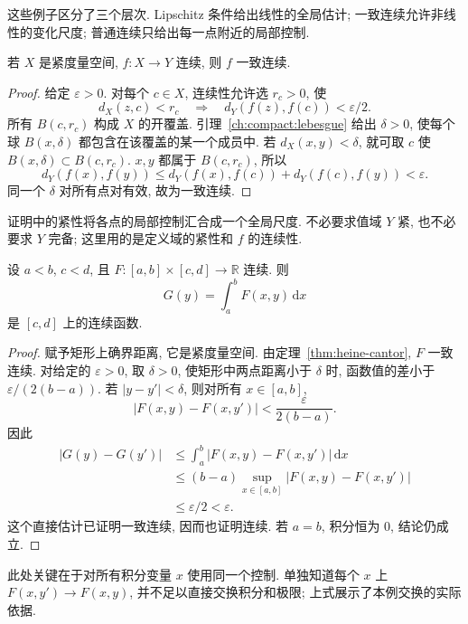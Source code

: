 这些例子区分了三个层次. Lipschitz 条件给出线性的全局估计; 一致连续允许非线性的变化尺度; 普通连续只给出每一点附近的局部控制.


\begin{theorem}\label{thm:heine-cantor}
若 $X$ 是紧度量空间, $f:X\to Y$ 连续, 则 $f$ 一致连续.
\end{theorem}
\begin{proof}
给定 $\varepsilon>0$. 对每个 $c\in X$, 连续性允许选 $r_c>0$, 使
\[
d_X(z,c)<r_c\quad\Longrightarrow\quad
d_Y(f(z),f(c))<\varepsilon/2.
\]
所有 $B(c,r_c)$ 构成 $X$ 的开覆盖. 引理~\ref{ch:compact:lebesgue} 给出 $\delta>0$, 使每个球 $B(x,\delta)$ 都包含在该覆盖的某一个成员中. 若 $d_X(x,y)<\delta$, 就可取 $c$ 使
$B(x,\delta)\subset B(c,r_c)$. $x,y$ 都属于 $B(c,r_c)$, 所以
\[
d_Y(f(x),f(y))\leq d_Y(f(x),f(c))+d_Y(f(c),f(y))
<\varepsilon.
\]
同一个 $\delta$ 对所有点对有效, 故为一致连续.
\end{proof}

证明中的紧性将各点的局部控制汇合成一个全局尺度. 不必要求值域 $Y$ 紧, 也不必要求 $Y$ 完备; 这里用的是定义域的紧性和 $f$ 的连续性.

\begin{proposition}\label{prop:parameter-integral}
设 $a<b$, $c<d$, 且 $F:[a,b]\times[c,d]\to\mathbb R$ 连续. 则
\[
G(y)=\int_a^bF(x,y)\,\mathrm dx
\]
是 $[c,d]$ 上的连续函数.
\end{proposition}
\begin{proof}
赋予矩形上确界距离, 它是紧度量空间. 由定理~\ref{thm:heine-cantor}, $F$ 一致连续. 对给定的 $\varepsilon>0$, 取 $\delta>0$, 使矩形中两点距离小于 $\delta$ 时, 函数值的差小于 $\varepsilon/(2(b-a))$. 若 $|y-y'|<\delta$, 则对所有 $x\in[a,b]$,
\[
|F(x,y)-F(x,y')|<\frac{\varepsilon}{2(b-a)}.
\]
因此
\begin{align*}
|G(y)-G(y')|
&\leq\int_a^b|F(x,y)-F(x,y')|\,\mathrm dx\\
&\leq(b-a)\sup_{x\in[a,b]}|F(x,y)-F(x,y')|\\
&\leq\varepsilon/2<\varepsilon.
\end{align*}
这个直接估计已证明一致连续, 因而也证明连续. 若 $a=b$, 积分恒为 $0$, 结论仍成立.
\end{proof}

此处关键在于对所有积分变量 $x$ 使用同一个控制. 单独知道每个 $x$ 上 $F(x,y')\to F(x,y)$, 并不足以直接交换积分和极限; 上式展示了本例交换的实际依据.


